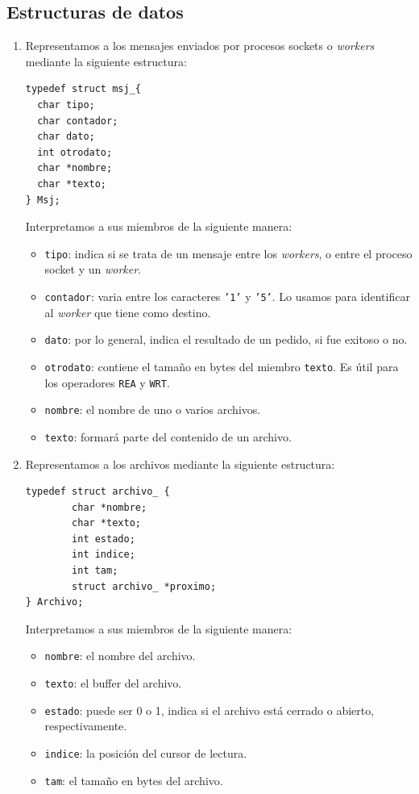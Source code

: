 \documentclass[a4paper, 8pt]{article}
\begin{document}
\subsection{Estructuras de datos}
\begin{enumerate}
\item Representamos a los mensajes enviados por procesos sockets o \textit{workers} mediante la siguiente estructura:
\begin{verbatim}
typedef struct msj_{
  char tipo;
  char contador;
  char dato;
  int otrodato;
  char *nombre;
  char *texto;
} Msj;
\end{verbatim}

\newpage
Interpretamos a sus miembros de la siguiente manera:

\begin{itemize}
  \item \texttt{tipo}: indica si se trata de un mensaje entre los \textit{workers}, o entre el proceso socket y un \textit{worker}.
  \item \texttt{contador}: varia entre los caracteres \texttt{'1'} y \texttt{'5'}. Lo usamos para identificar al \textit{worker} que tiene como destino.
  \item \texttt{dato}: por lo general, indica el resultado de un pedido, si fue exitoso o no.
  \item \texttt{otrodato}: contiene el tamaño en bytes del miembro \texttt{texto}. Es útil para los operadores \texttt{REA} y \texttt{WRT}.
  \item \texttt{nombre}: el nombre de uno o varios archivos.
  \item \texttt{texto}: formará parte del contenido de un archivo.
\end{itemize}

\item Representamos a los archivos mediante la siguiente estructura:

\begin{verbatim}
typedef struct archivo_ {
	    char *nombre;
	    char *texto;
	    int estado;
	    int indice;
	    int tam;
	    struct archivo_ *proximo;
} Archivo;
\end{verbatim}

Interpretamos a sus miembros de la siguiente manera:

\begin{itemize}
  \item \texttt{nombre}: el nombre del archivo.
  \item \texttt{texto}: el buffer del archivo.
  \item \texttt{estado}: puede ser 0 o 1, indica si el archivo está cerrado o abierto, respectivamente.
  \item \texttt{indice}: la posición del cursor de lectura.
  \item \texttt{tam}: el tamaño en bytes del archivo.
\end{itemize}

\end{enumerate}
\end{document}

